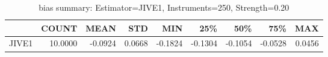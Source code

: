 \begin{table}[ht]
\centering
\caption{bias summary: Estimator=JIVE1, Instruments=250, Strength=0.20}
\begin{tabular}{lrrrrrrrr}
\toprule
 & COUNT & MEAN & STD & MIN & 25\% & 50\% & 75\% & MAX \\
\midrule
JIVE1 & 10.0000 & -0.0924 & 0.0668 & -0.1824 & -0.1304 & -0.1054 & -0.0528 & 0.0456 \\
\bottomrule
\end{tabular}
\end{table}
